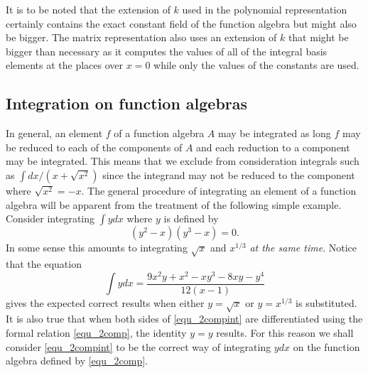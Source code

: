 \documentclass[12pt,reqno]{amsart}
\numberwithin{equation}{section}
\begin{document}
It is to be noted that the extension of $k$ used in the polynomial representation certainly contains the exact constant field of the function algebra but might also be bigger. The matrix representation also uses an extension of $k$ that might be bigger than necessary as it computes the values of all of the integral basis elements at the places over $x=0$ while only the values of the constants are used.


\subsection{Integration on function algebras}
In general, an element $f$ of a function algebra $A$ may be integrated as long $f$ may be reduced to each of the components of $A$ and each reduction to a component may be integrated. This means that we exclude from consideration integrals such as $\int dx/(x+\sqrt{x^2})$ since the integrand may not be reduced to the component where $\sqrt{x^2}=-x$. The general procedure of integrating an element of a function algebra will be apparent from the treatment of the following simple example. Consider integrating $\int y dx$ where $y$ is defined by
\begin{equation}
\label{equ_2comp}
 (y^2-x)(y^3-x)=0\text{.}
\end{equation}
In some sense this amounts to integrating $\sqrt{x}$ and $x^{1/3}$ \emph{at the same time}. Notice that the equation
\begin{equation}
\label{equ_2compint}
 \int y dx = \frac{9 x^2 y+x^2-x y^3-8 x y-y^4}{12 (x-1)}
\end{equation}
gives the expected correct results when either $y=\sqrt{x}$ or $y=x^{1/3}$ is substituted. It is also true that when both sides of \eqref{equ_2compint} are differentiated using the formal relation \eqref{equ_2comp}, the identity $y=y$ results. For this reason we shall consider \eqref{equ_2compint} to be the correct way of integrating $y dx$ on the function algebra defined by \eqref{equ_2comp}. 
\end{document}
